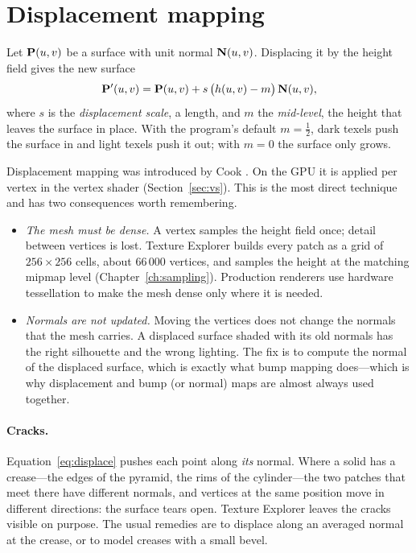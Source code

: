 \section{Displacement mapping}
\label{sec:displacement}

Let $\mathbf{P}(u,v)$ be a surface with unit normal $\mathbf{N}(u,v)$. Displacing it by the height
field gives the new surface
\begin{equation}
  \label{eq:displace}
  \mathbf{P}'(u,v) = \mathbf{P}(u,v) + s\,\bigl(h(u,v)-m\bigr)\,\mathbf{N}(u,v),
\end{equation}
where $s$ is the \emph{displacement scale}, a length, and $m$ the \emph{mid-level}, the height
that leaves the surface in place. With the program's default $m=\frac12$, dark texels push the
surface in and light texels push it out; with $m=0$ the surface only grows.

Displacement mapping was introduced by Cook \cite{cook1984}. On the GPU it is applied per vertex in the vertex shader (Section~\ref{sec:vs}).
This is the most direct technique and has two consequences worth remembering.
\begin{itemize}
\item \emph{The mesh must be dense.} A vertex samples the height field once; detail between
vertices is lost. Texture Explorer builds every patch as a grid of $256\times256$ cells,
about $66\,000$ vertices, and samples the height at the matching mipmap level
(Chapter~\ref{ch:sampling}). Production renderers use hardware tessellation to make the mesh
dense only where it is needed.
\item \emph{Normals are not updated.} Moving the vertices does not change the normals that the
mesh carries. A displaced surface shaded with its old normals has the right silhouette and the
wrong lighting. The fix is to compute the normal of the displaced surface, which is exactly
what bump mapping does---which is why displacement and bump (or normal) maps are almost always
used together.
\end{itemize}

\paragraph{Cracks.} Equation~\eqref{eq:displace} pushes each point along \emph{its} normal.
Where a solid has a crease---the edges of the pyramid, the rims of the cylinder---the two
patches that meet there have different normals, and vertices at the same position move in
different directions: the surface tears open. Texture Explorer leaves the cracks visible on
purpose. The usual remedies are to displace along an averaged normal at the crease, or to
model creases with a small bevel.

